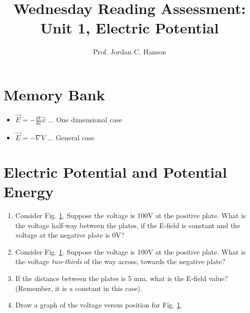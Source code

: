 \documentclass{article}
\begin{document}
\title{Wednesday Reading Assessment: Unit 1, Electric Potential}
\author{Prof. Jordan C. Hanson}

\maketitle

\section{Memory Bank}

\begin{itemize}
\item $\vec{E} = -\frac{dV}{dx} \hat{x}$ ... One dimensional case
\item $\vec{E} = -\nabla V$ ... General case
\end{itemize}

\section{Electric Potential and Potential Energy}

\begin{enumerate}
\begin{figure}[ht]
\centering
\texttt{[image: plates.png]}
\caption{\label{fig:hill} Voltage is a linear function of distance from the positive plate to the negative plate.}
\end{figure}
\item Consider Fig. \ref{fig:hill}.  Suppose the voltage is 100V at the positive plate.  What is the voltage half-way between the plates, if the E-field is constant and the voltage at the negative plate is 0V? \\ \vspace{1cm}
\item Consider Fig. \ref{fig:hill}.  Suppose the voltage is 100V at the positive plate.  What is the voltage \textit{two-thirds} of the way across, towards the negative plate? \\ \vspace{1cm}
\item If the distance between the plates is 5 mm, what is the E-field value?  (Remember, it is a constant in this case). \\ \vspace{1cm}
\item Draw a graph of the voltage versus position for Fig. \ref{fig:hill}. \\ \vspace{1cm}
\end{enumerate}
\end{document}
